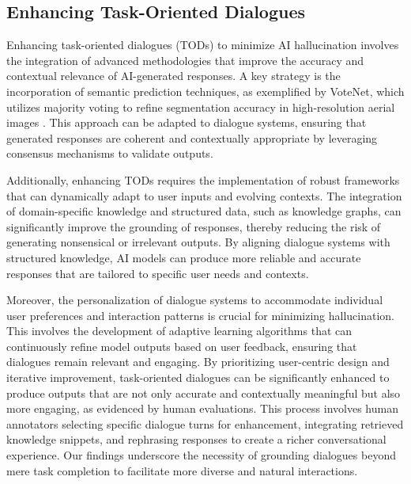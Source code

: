 \subsection{Enhancing Task-Oriented Dialogues} \label{subsec:Enhancing Task-Oriented Dialogues}

Enhancing task-oriented dialogues (TODs) to minimize AI hallucination involves the integration of advanced methodologies that improve the accuracy and contextual relevance of AI-generated responses. A key strategy is the incorporation of semantic prediction techniques, as exemplified by VoteNet, which utilizes majority voting to refine segmentation accuracy in high-resolution aerial images \cite{meyarian2023votingnetworkcontourlevee}. This approach can be adapted to dialogue systems, ensuring that generated responses are coherent and contextually appropriate by leveraging consensus mechanisms to validate outputs.



Additionally, enhancing TODs requires the implementation of robust frameworks that can dynamically adapt to user inputs and evolving contexts. The integration of domain-specific knowledge and structured data, such as knowledge graphs, can significantly improve the grounding of responses, thereby reducing the risk of generating nonsensical or irrelevant outputs. By aligning dialogue systems with structured knowledge, AI models can produce more reliable and accurate responses that are tailored to specific user needs and contexts.



Moreover, the personalization of dialogue systems to accommodate individual user preferences and interaction patterns is crucial for minimizing hallucination. This involves the development of adaptive learning algorithms that can continuously refine model outputs based on user feedback, ensuring that dialogues remain relevant and engaging. By prioritizing user-centric design and iterative improvement, task-oriented dialogues can be significantly enhanced to produce outputs that are not only accurate and contextually meaningful but also more engaging, as evidenced by human evaluations. This process involves human annotators selecting specific dialogue turns for enhancement, integrating retrieved knowledge snippets, and rephrasing responses to create a richer conversational experience. Our findings underscore the necessity of grounding dialogues beyond mere task completion to facilitate more diverse and natural interactions. \cite{stricker2024enhancingtaskorienteddialogueschitchat}




